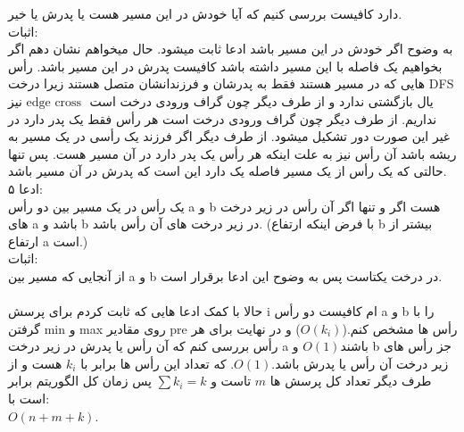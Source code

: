 دارد کافیست بررسی کنیم که آیا خودش در این مسیر هست یا پدرش یا خیر.\\
اثبات:\\
به وضوح اگر خودش در این مسیر باشد ادعا ثابت میشود. حال میخواهم نشان دهم اگر
بخواهیم یک فاصله با این مسیر داشته باشد کافیست پدرش در این مسیر باشد.
رأس هایی که در مسیر هستند فقط به پدرشان و فرزندانشان متصل هستند
زیرا درخت DFS یال بازگشتی ندارد و از طرف دیگر چون گراف ورودی درخت است
$\text{edge cross }$ نیز نداریم.
از طرف دیگر چون گراف ورودی درخت است هر رأس فقط یک پدر دارد در غیر این صورت
دور تشکیل میشود.
از طرف دیگر اگر فرزند یک رأسی در یک مسیر به ریشه باشد
آن رأس نیز به علت اینکه هر رأس یک پدر دارد در آن مسیر هست.
پس تنها حالتی که یک رأس از یک مسیر فاصله یک دارد این است که پدرش در 
آن مسیر باشد.\\
ادعا ۵:\\
یک رأس در یک مسیر بین دو رأس a و b هست اگر و تنها اگر
آن رأس در زیر درخت های a باشد و b در زیر درخت های آن رأس باشد.
(با فرض اینکه ارتفاع b بیشتر از ارتفاع a است.)\\
اثبات:\\
از آنجایی که مسیر بین a و b در درخت یکتاست پس به وضوح این ادعا برقرار است.\\\\
حالا با کمک ادعا هایی که ثابت کردم برای پرسش i ام کافیست
دو رأس a و b را با گرفتن min و max روی مقادیر pre رأس ها مشخص کنم.($O(k_i)$)
و در نهایت برای هر رأس بررسی کنم که آن رأس یا پدرش در زیر درخت a باشند$O(1)$
و b جز رأس های زیر درخت آن رأس یا پدرش باشد.$O(1)$.
که تعداد این رأس ها برابر با $k_i$ هست و از طرف دیگر
تعداد کل پرسش ها $m$ تاست و $\sum{k_i} = k$ پس زمان کل الگوریتم برابر است با:\\
$O(n+m+k)$.